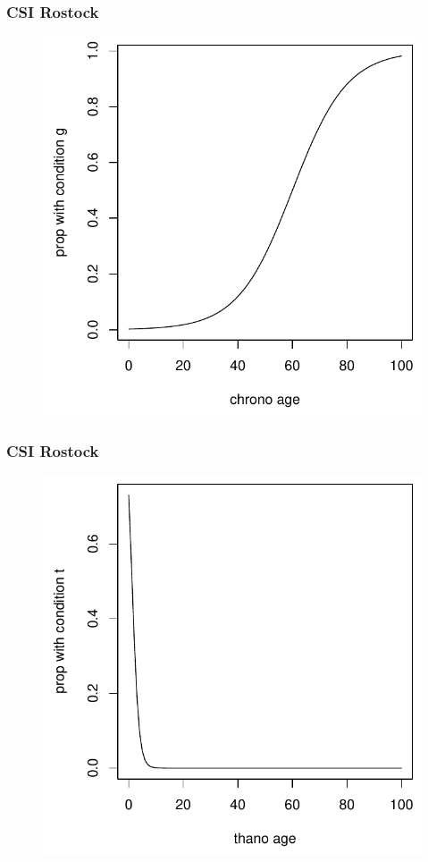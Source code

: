 \documentclass[20pt]{beamer}
\begin{document}
\begin{frame}
\frametitle{CSI Rostock}
\begin{figure}[b]
    \centering
    \includegraphics[scale=1.2]{Figures/LabPres/Z2gx.pdf}
\end{figure} 
\end{frame}

\begin{frame}
\frametitle{CSI Rostock}
\begin{figure}[b]
    \centering
    \includegraphics[scale=1.2]{Figures/LabPres/Z3ty.pdf}
\end{figure} 
\end{frame}
\end{document}
